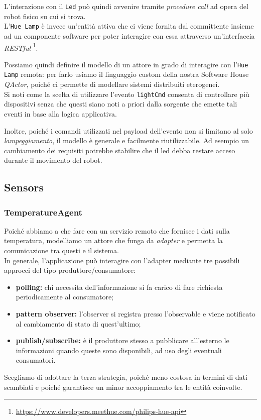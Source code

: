 \documentclass{../llncs}
\newcommand{\codescript}[1]{{\mbox{\small{\texttt{#1}}}}\xspace}
\newcommand{\qa}{\textsf{\textit{QActor}}\xspace}
\begin{document}
L'interazione con il \texttt{Led} può quindi avvenire tramite \textit{procedure call} ad opera del robot fisico su cui si trova.\\

L'\texttt{Hue Lamp} è invece un'entità attiva che ci viene fornita dal committente insieme ad un componente software per poter interagire con essa attraverso un'interfaccia \textit{RESTful}
\footnote{\url{https://www.developers.meethue.com/philips-hue-api}}.

Possiamo quindi definire il modello di un attore in grado di interagire con l'\texttt{Hue Lamp} remota: per farlo usiamo il linguaggio custom della nostra Software House \qa, poiché ci permette di modellare sistemi distribuiti eterogenei.\\



Si noti come la scelta di utilizzare l'evento \codescript{lightCmd} consenta di controllare più dispositivi senza che questi siano noti a priori dalla sorgente che emette tali eventi in base alla logica applicativa.

Inoltre, poiché i comandi utilizzati nel payload dell'evento non si limitano al solo \textit{lampeggiamento}, il modello è generale e facilmente riutilizzabile. Ad esempio un cambiamento dei requisiti potrebbe stabilire che il led debba restare acceso durante il movimento del robot.

\subsection{Sensors}

\subsubsection{TemperatureAgent}
Poiché abbiamo a che fare con un servizio remoto che fornisce i dati sulla temperatura, modelliamo un attore che funga da \emph{adapter} e permetta la comunicazione tra questi e il sistema.\\

In generale, l'applicazione può interagire con l'adapter mediante tre possibili approcci del tipo produttore/consumatore:
\begin{itemize}
\item \textbf{polling:} chi necessita dell'informazione si fa carico di fare richiesta periodicamente al consumatore;
\item \textbf{pattern observer:} l'observer si registra presso l'observable e viene notificato al cambiamento di stato di quest'ultimo;
\item \textbf{publish/subscribe:} è il produttore stesso a pubblicare all'esterno le informazioni quando queste sono disponibili, ad uso degli eventuali consumatori.
\end{itemize}
Scegliamo di adottare la terza strategia, poiché meno costosa in termini di dati scambiati e poiché garantisce un minor accoppiamento tra le entità coinvolte.
\end{document}
